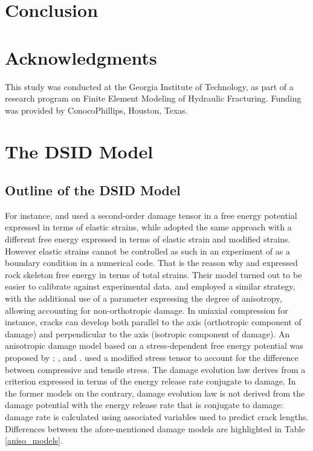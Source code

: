 \documentclass[preprint,review,12pt]{elsarticle}
\begin{document}
\section{Conclusion}



\section*{Acknowledgments}
This study was conducted at the Georgia Institute of Technology, as part of a research program on Finite Element Modeling of Hydraulic Fracturing. Funding was provided by ConocoPhillips, Houston, Texas.

\appendix
\section{The DSID Model}

\subsection{Outline of the DSID Model}

For instance, \cite{Abualrub2010} and \cite{Cicekli2007} used a second-order damage tensor in a free energy potential expressed in terms of elastic strains, while \cite{Murakami1996} adopted the same approach with a different free energy expressed in terms of elastic strain and modified strains. However elastic strains cannot be controlled as such in an experiment of as a boundary condition in a numerical code. That is the reason why \cite{Halm1998} and \cite{Homand-Etienne1998} expressed rock skeleton free energy in terms of total strains. Their model turned out to be easier to calibrate against experimental data. \cite{Chaboche1993} and \cite{Pellet2005} employed a similar strategy, with the additional use of a parameter expressing the degree of anisotropy, allowing accounting for non-orthotropic damage. In uniaxial compression for instance, cracks can develop both parallel to the axis (orthotropic component of damage) and perpendicular to the axis (isotropic component of damage). An anisotropic damage model based on a stress-dependent free energy potential was proposed by \cite{Shao2005}; \cite{Shao2006}, \cite{Zhou2006} and \cite{Hayakawa1997}. \cite{Hayakawa1997} used a modified stress tensor to account for the difference between compressive and tensile stress. The damage evolution law derives from a criterion expressed in terms of the energy release rate conjugate to damage. In the former models on the contrary, damage evolution law is not derived from the damage potential with the energy release rate that is conjugate to damage: damage rate is calculated using associated variables used to predict crack lengths. Differences between the afore-mentioned damage models are highlighted in Table \ref{aniso_models}.
\end{document}
